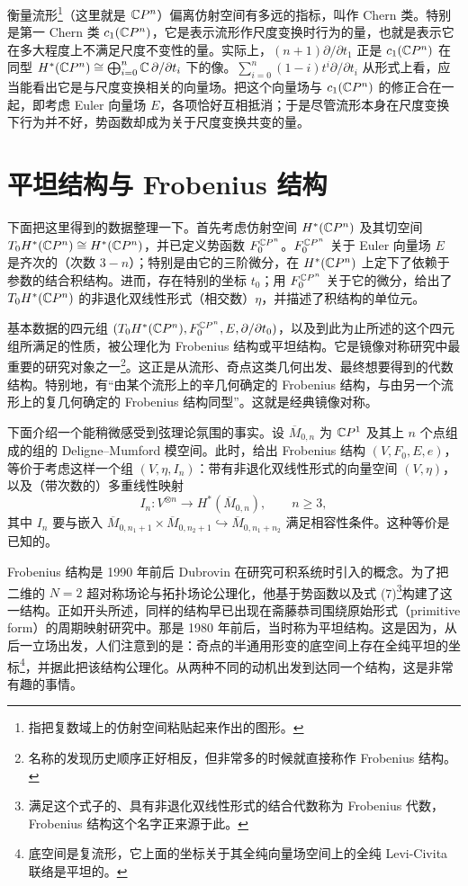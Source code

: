 衡量流形\footnote{指把复数域上的仿射空间粘贴起来作出的图形。}（这里就是 $\mathbb{C}P^n$）偏离仿射空间有多远的指标，叫作 Chern 类。特别是第一 Chern 类 $c_1(\mathbb{C}P^n)$，它是表示流形作尺度变换时行为的量，也就是表示它在多大程度上不满足尺度不变性的量。实际上，$(n+1)\partial/\partial t_1$ 正是 $c_1(\mathbb{C}P^n)$ 在同型 $H^*(\mathbb{C}P^n)\cong\bigoplus_{i=0}^{n}\mathbb{C}\,\partial/\partial t_i$ 下的像。$\sum_{i=0}^{n}(1-i)t^i\partial/\partial t_i$ 从形式上看，应当能看出它是与尺度变换相关的向量场。把这个向量场与 $c_1(\mathbb{C}P^n)$ 的修正合在一起，即考虑 Euler 向量场 $E$，各项恰好互相抵消；于是尽管流形本身在尺度变换下行为并不好，势函数却成为关于尺度变换共变的量。%

\section{平坦结构与 Frobenius 结构}

下面把这里得到的数据整理一下。首先考虑仿射空间 $H^*(\mathbb{C}P^n)$ 及其切空间 $T_0H^*(\mathbb{C}P^n)\cong H^*(\mathbb{C}P^n)$，并已定义势函数 $F_0^{\mathbb{C}P^n}$。$F_0^{\mathbb{C}P^n}$ 关于 Euler 向量场 $E$ 是齐次的（次数 $3-n$）；特别是由它的三阶微分，在 $H^*(\mathbb{C}P^n)$ 上定下了依赖于参数的结合积结构。进而，存在特别的坐标 $t_0$；用 $F_0^{\mathbb{C}P^n}$ 关于它的微分，给出了 $T_0H^*(\mathbb{C}P^n)$ 的非退化双线性形式（相交数）$\eta$，并描述了积结构的单位元。

基本数据的四元组 $(T_0H^*(\mathbb{C}P^n),F_0^{\mathbb{C}P^n},E,\partial/\partial t_0)$，以及到此为止所述的这个四元组所满足的性质，被公理化为 Frobenius 结构或平坦结构。它是镜像对称研究中最重要的研究对象之一\footnote{名称的发现历史顺序正好相反，但非常多的时候就直接称作 Frobenius 结构。}。这正是从流形、奇点这类几何出发、最终想要得到的代数结构。特别地，有“由某个流形上的辛几何确定的 Frobenius 结构，与由另一个流形上的复几何确定的 Frobenius 结构同型”。这就是经典镜像对称。

下面介绍一个能稍微感受到弦理论氛围的事实。设 $\overline{M}_{0,n}$ 为 $\mathbb{C}P^1$ 及其上 $n$ 个点组成的组的 Deligne--Mumford 模空间。此时，给出 Frobenius 结构 $(V,F_0,E,e)$，等价于考虑这样一个组 $(V,\eta,I_n)$：带有非退化双线性形式的向量空间 $(V,\eta)$，以及（带次数的）多重线性映射
\[
  I_n:V^{\otimes n}\longrightarrow H^*(\overline{M}_{0,n}),\qquad n\ge 3,
\]
其中 $I_n$ 要与嵌入 $\overline{M}_{0,n_1+1}\times\overline{M}_{0,n_2+1}\hookrightarrow\overline{M}_{0,n_1+n_2}$ 满足相容性条件。这种等价是已知的。

Frobenius 结构是 1990 年前后 Dubrovin 在研究可积系统时引入的概念。为了把二维的 $N=2$ 超对称场论与拓扑场论公理化，他基于势函数以及式 (7)\footnote{满足这个式子的、具有非退化双线性形式的结合代数称为 Frobenius 代数，Frobenius 结构这个名字正来源于此。}构建了这一结构。正如开头所述，同样的结构早已出现在斋藤恭司围绕原始形式（primitive form）的周期映射研究中。那是 1980 年前后，当时称为平坦结构。这是因为，从后一立场出发，人们注意到的是：奇点的半通用形变的底空间上存在全纯平坦的坐标\footnote{底空间是复流形，它上面的坐标关于其全纯向量场空间上的全纯 Levi-Civita 联络是平坦的。}，并据此把该结构公理化。从两种不同的动机出发到达同一个结构，这是非常有趣的事情。

